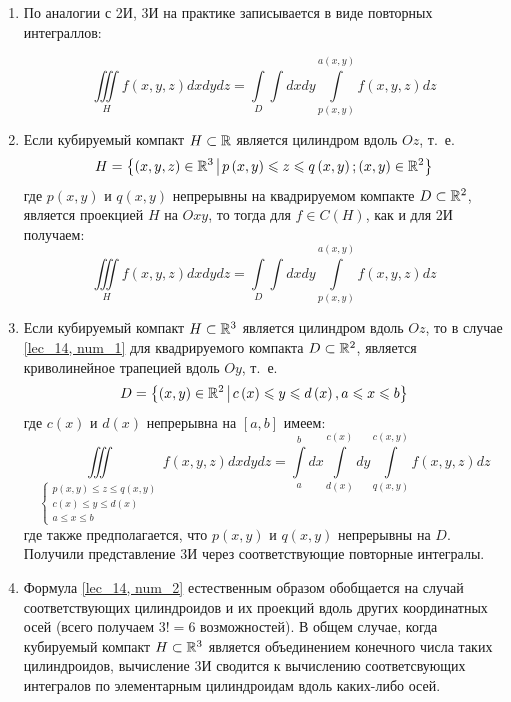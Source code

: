 \documentclass[../../main.tex]{subfiles}
\begin{document}
	\begin{rems}
		\quad
		\begin{enumerate}
			\item По аналогии с 2И, 3И на практике записывается в виде повторных 
			интеграллов:
			
			\begin{equation}
			\iiint\limits_{H} f \left( x, y, z \right) dx dy dz = \int\limits_{D}\int 
			dx dy \int\limits_{p\left(x, y\right)}^{a\left(x, y \right)} f\left(x, y, 
			z\right) dz \label{lec_14, num_1}
			\end{equation}
			
			\item Если кубируемый компакт $H \subset \mathbb{R}$ является цилиндром вдоль $Oz$, 
			т.~е. 
			\[H = \left\{\left(x, y, z \right) \in \R^3 \; \vline \; p \left(x, 
			y\right) \leq z \leq q \left(x, y \right) ; \left(x, y\right) \in \R^2 
			\right\} \]
			где $p\left(x, y\right)$ и $q\left(x, y\right)$ непрерывны на квадрируемом 
			компакте $D \subset \mathbb{R}^2$, является проекцией $H$ на $Oxy$, то тогда для $f 
			\in C\left(H\right)$, как и для 2И получаем:
			\[\iiint\limits_{H} f \left( x, y, z \right) dx dy dz = \int\limits_{D}\int 
			dx dy \int\limits_{p\left(x, y\right)}^{a\left(x, y \right)} f\left(x, y, 
			z\right) dz\]
			
			\item Если кубируемый компакт $H \subset \mathbb{R}^3$ является цилиндром вдоль 
			$Oz$, то в случае \eqref{lec_14, num_1} для квадрируемого компакта $D 
			\subset \mathbb{R}^2$, является криволинейное трапецией вдоль $Oy$, т.~е.
			\[D = \left\{\left(x, y\right) \in \R^2 \; \vline \; c \left(x\right) \leq 
			y \leq d \left(x \right), a \leq x \leq b \right\} \]
			где $c(x)$ и $d(x)$ непрерывна на $\left[a, b\right]$ имеем:
			\begin{equation}
			\iiint\limits_{\begin{cases}
				p\left(x, y\right) \leq z \leq q\left(x, y\right)\\
				c\left(x\right) \leq y \leq d\left(x\right)\\
				a \leq x \leq b
				\end{cases}} f \left( x, y, z \right) dx dy dz = \int\limits_{a}^{b} dx 
				\int\limits_{d\left(x\right)}^{c\left(x\right)} dy \int\limits_{q\left(x, 
				y\right)}^{c\left(x, y\right)} f(x, y, z) dz \label{lec_14, num_2}
			\end{equation}
			где также предполагается, что $p\left(x, y\right)$ и $q\left(x, y\right)$ 
			непрерывны на $D$.
			Получили представление 3И через соответствующие повторные интегралы.
			
			\item Формула \eqref{lec_14, num_2} естественным образом обобщается на 
			случай соответствующих цилиндроидов и их проекций вдоль других координатных 
			осей (всего получаем $3! = 6$ возможностей). В общем случае, когда 
			кубируемый компакт $H \subset \mathbb{R}^3$ является объединением конечного числа 
			таких цилиндроидов, вычисление 3И сводится к вычислению соответсвующих 
			интегралов по элементарным цилиндроидам вдоль каких-либо осей. 
		\end{enumerate}
	\end{rems}
\end{document}
